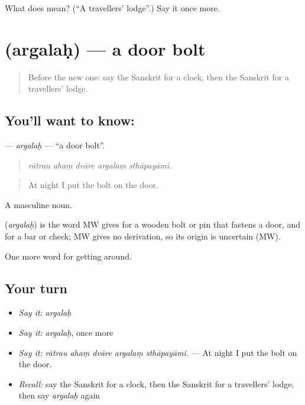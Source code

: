 \begin{tcolorbox}[breakable,colback=teal!4,colframe=teal!35!black,title={Before you move on}]
What does  mean? (\textquotedblleft{}A travellers' lodge\textquotedblright{}.) Say it once more.
\end{tcolorbox}
\section[\texorpdfstring{\sk{अर्गलः} (argalaḥ)}{अर्गलः (argalaḥ)}]{ (argalaḥ) — a door bolt}

\label{lesson:SA-C429-argalah}



\begin{quote}
Before the new one: say the Sanskrit for a clock, then the Sanskrit for a travellers' lodge.
\end{quote}

\subsection*{You'll want to know: }
\textbf{} — \emph{argalaḥ} — \textquotedblleft{}a door bolt\textquotedblright{}.

\begin{quote}
    
\end{quote}

\begin{quote}
\emph{rātrau ahaṃ dvāre argalaṃ sthāpayāmi.}
\end{quote}

\begin{quote}
At night I put the bolt on the door.
\end{quote}

A masculine noun.

\begin{cousinweb}
\textbf{} (\emph{argalaḥ}) is the word MW gives for a wooden bolt or pin that fastens a door, and for a bar or check; MW gives no derivation, so its origin is uncertain (MW).
\end{cousinweb}

\begin{grammarlens}[title={What you've built}]
One more word for getting around.
\end{grammarlens}

\subsection*{Your turn}
\begin{itemize}
\raggedright
  \item \emph{Say it:} \emph{argalaḥ}
  \item \emph{Say it:} \emph{argalaḥ}, once more
  \item \emph{Say it:} \emph{rātrau ahaṃ dvāre argalaṃ sthāpayāmi.} — At night I put the bolt on the door.
  \item \emph{Recall:} say the Sanskrit for a clock, then the Sanskrit for a travellers' lodge, then say \emph{argalaḥ} again
\end{itemize}


